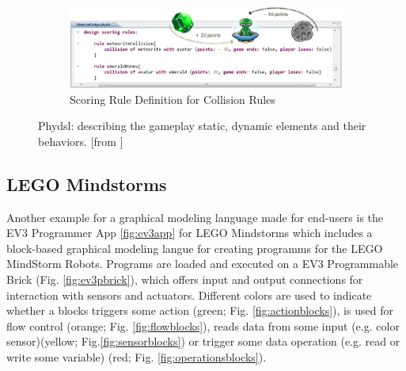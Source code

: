 \documentclass[runningheads,a4paper]{llncs}
\begin{document}
\begin{figure}[H]
\begin{subfigure}[t]{0.45\textwidth}\centering\includegraphics[width=.9\columnwidth]{images/PhyDSL4.PNG}
\caption{Scoring Rule Definition for Collision Rules}\label{rulesdef}\end{subfigure}
\caption{Phydsl:  describing the gameplay static, dynamic elements and their behaviors. [from  \cite{guana2014phydsl}]}
\end{figure}

   \subsection{LEGO Mindstorms}
   Another example for a graphical modeling language made for end-users is the EV3 Programmer App \ref{fig:ev3app}
   for LEGO Mindstorms which includes a block-based graphical modeling langue for creating programms
   for the LEGO MindStorm Robots. Programs are loaded and executed on a EV3 Programmable Brick (Fig. \ref{fig:ev3pbrick}), 
   which offers input and output connections for interaction with sensors and actuators.
   Different colors are used to indicate whether a blocks triggers some action (green; Fig. \ref{fig:actionblocks}), is used for flow control (orange; Fig. \ref{fig:flowblocks}),
   reads data from some input (e.g. color sensor)(yellow; Fig.\ref{fig:sensorblocks}) or trigger some data operation (e.g. read or write some variable) (red; Fig. \ref{fig:operationsblocks}).
   
\end{document}
